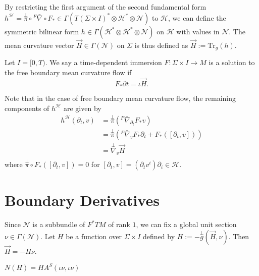 By restricting the first argument of the second fundamental form $h^{\mathcal{H} }=\overset{\perp }{\pi} \circ {}^F \bar{\nabla } \circ F_* \in \Gamma (T(\Sigma \times I)^* \otimes \mathcal{H} ^* \otimes \mathcal{N} )$ to $\mathcal{H} $, we can define the symmetric bilinear form $h \in \Gamma (\mathcal{H} ^* \otimes \mathcal{H} ^* \otimes \mathcal{N})$ on $\mathcal{H} $ with values in $\mathcal{N} $. The mean curvature vector $\vec{H} \in \Gamma (\mathcal{N} )$ on $\Sigma $ is thus defined as $\vec{H} := \mathrm{Tr}_g(h)$.

Let $I=[0,T)$. We say a time-dependent immersion $F: \Sigma \times I \to M$ is a solution to the free boundary mean curvature flow if \[F_* \partial t = \iota \vec{H}.\]

Note that in the case of free boundary mean curvature flow, the remaining components of $h^{\mathcal{H} }$ are given by
\begin{equation}
\begin{split}
    h^{\mathcal{H} }(\partial_t, v) 
&= \overset{\perp }{\pi} ({}^F \bar{\nabla }_{\partial _t} F_* v)  \\
&= \overset{\perp }{\pi} ({}^F \bar{\nabla }_{v} F_* \partial _t+F_*([\partial_t,v]))  \\
&= \overset{\perp }{\nabla} _v \vec{H}  \\
\end{split}
\end{equation} 
where $\overset{\perp }{\pi} \circ  F_*([\partial_t,v])=0$ for $[\partial _t, v]=(\partial _t v^i) \partial _i \in \mathcal{H} $.

\section{Boundary Derivatives}

Since $\mathcal{N} $ is a subbundle of $F^*TM $  of rank $1$, we can fix a global unit section $\nu \in \Gamma (\mathcal{N} )$. Let $H$ be a function over $\Sigma \times I$ defined by $H:=-\overset{\perp }{g} (\vec{H},\nu )$. Then $\vec{H}=-H \nu $.

\begin{theorem}
    $N(H)=H A^S(\iota \nu , \iota \nu )$ 
\end{theorem}

